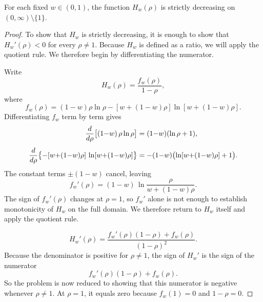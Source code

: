 \begin{lemma}
\label{lem:Hw_monotone}
For each fixed $w \in (0,1)$, the function $H_w(\rho)$ is strictly decreasing
on $(0,\infty) \setminus \{1\}$.
\end{lemma}

\begin{proof}
To show that $H_w$ is strictly decreasing, it is enough to show that
$H_w'(\rho) < 0$ for every $\rho \neq 1$. Because $H_w$ is defined as a ratio,
we will apply the quotient rule. We therefore begin by differentiating the
numerator.

Write
\[
  H_w(\rho)
  = \frac{f_w(\rho)}{1-\rho},
\]
where
\[
  f_w(\rho)
  = (1-w)\rho\ln\rho
  - [w + (1-w)\rho]\ln[w + (1-w)\rho].
\]
Differentiating $f_w$ term by term gives
\begin{align}
  \frac{d}{d\rho}\bigl[(1{-}w)\,\rho\ln\rho\bigr]
    &= (1{-}w)(\ln\rho + 1),
  \notag\\[4pt]
  \frac{d}{d\rho}
  \bigl\{
    {-}[w{+}(1{-}w)\rho]\,
    \ln[w{+}(1{-}w)\rho]
  \bigr\}
    &= -(1{-}w)
       \bigl(\ln[w{+}(1{-}w)\rho] + 1\bigr).
  \notag
\end{align}
The constant terms $\pm(1{-}w)$ cancel, leaving
\begin{equation}\label{eq:f_prime}
  f_w'(\rho)
  = (1{-}w)\,
    \ln\frac{\rho}{w + (1{-}w)\rho}.
\end{equation}
The sign of $f_w'(\rho)$ changes at $\rho = 1$, so $f_w'$ alone is not enough
to establish monotonicity of $H_w$ on the full domain. We therefore return to
$H_w$ itself and apply the quotient rule.

\begin{equation}\label{eq:qr_num}
  H_w'(\rho)
  = \frac{f_w'(\rho)(1-\rho) + f_w(\rho)}{(1-\rho)^2}.
\end{equation}
Because the denominator is positive for $\rho \neq 1$, the sign of $H_w'$
is the sign of the numerator
\[
  f_w'(\rho)(1-\rho) + f_w(\rho).
\]
So the problem is now reduced to showing that this numerator is negative
whenever $\rho \neq 1$. At $\rho = 1$, it equals zero because
$f_w(1) = 0$ and $1-\rho = 0$.


\end{proof}
